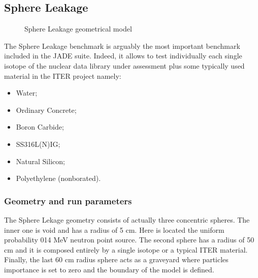 \documentclass[letterpaper,10pt,english]{sphinxmanual}
\begin{document}
\subsection{Sphere Leakage}
\label{\detokenize{usage/benchmarks:sphere-leakage}}\label{\detokenize{usage/benchmarks:spheredesc}}
\begin{figure}[htbp]
\centering
\capstart

\noindent{}
\caption{Sphere Leakage geometrical model}\label{\detokenize{usage/benchmarks:id16}}\end{figure}

\sphinxAtStartPar
The Sphere Leakage benchmark is arguably the most important
benchmark included in the JADE suite. Indeed, it allows to test
individually each single isotope of the nuclear data library under assessment
plus some typically used material in the ITER project namely:
\begin{itemize}
\item {} 
\sphinxAtStartPar
Water;

\item {} 
\sphinxAtStartPar
Ordinary Concrete;

\item {} 
\sphinxAtStartPar
Boron Carbide;

\item {} 
\sphinxAtStartPar
SS316L(N)\sphinxhyphen{}IG;

\item {} 
\sphinxAtStartPar
Natural Silicon;

\item {} 
\sphinxAtStartPar
Polyethylene (non\sphinxhyphen{}borated).

\end{itemize}


\subsubsection{Geometry and run parameters}
\label{\detokenize{usage/benchmarks:geometry-and-run-parameters}}
\sphinxAtStartPar
The Sphere Lekage geometry consists of actually three
concentric spheres. The inner one is void and has a radius of 5 cm. Here
is located the uniform probability 0\sphinxhyphen{}14 MeV neutron point source. The second sphere
has a radius of 50 cm and it is composed entirely by a single isotope
or a typical ITER material. Finally,
the last 60 cm radius sphere acts as a graveyard where particles importance is
set to zero and the boundary of the model is defined.
\end{document}
